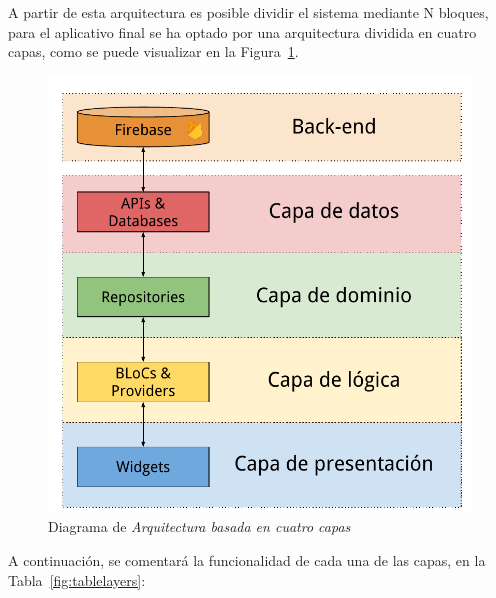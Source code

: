 A partir de esta arquitectura es posible dividir el sistema mediante N bloques, para el aplicativo final se ha optado por una
arquitectura dividida en cuatro capas, como se puede visualizar en la Figura~\ref{fig:architecture1}.

\begin{figure}[H]
  \centering
  \includegraphics[scale=0.7]{images/architecture.pdf}
  \caption{Diagrama de \textit{Arquitectura basada en cuatro capas}}
  \label{fig:architecture1}
\end{figure}

A continuación, se comentará la funcionalidad de cada una de las capas, en la Tabla~\ref{fig:tablelayers}:

